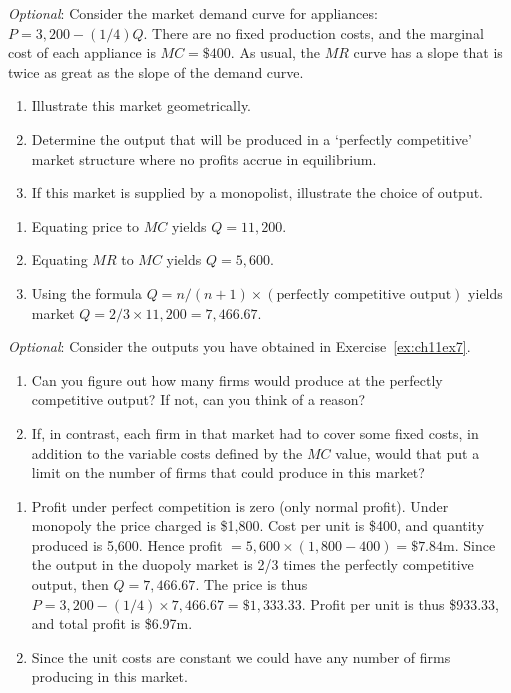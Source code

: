 \begin{enumialphparenastyle}
\begin{econex}\label{ex:ch11ex7}
\textit{Optional}: Consider the market demand curve for appliances: $P=3,200-(1/4)Q$. There are no fixed production costs, and the marginal cost of each appliance is $MC=\$400$. As usual, the $MR$ curve has a slope that is twice as great as the slope of the demand curve.
\begin{enumerate}
\item	Illustrate this market geometrically.
\item	Determine the output that will be produced in a `perfectly competitive' market structure where no profits accrue in equilibrium.
\item	If this market is supplied by a monopolist, illustrate the choice of output.
\end{enumerate}
\begin{econsolution}
\begin{enumerate}
\item	Equating price to $MC$ yields $Q=11,200$.
\item	Equating $MR$ to $MC$ yields $Q=5,600$.
\item	Using the formula $Q=n/(n+1)\times(\text{perfectly competitive output})$ yields market $Q=2/3\times 11,200=7,466.67$.
\end{enumerate}
\end{econsolution}
\end{econex}

\begin{econex}\label{ex:ch11ex8}
\textit{Optional}: Consider the outputs you have obtained in Exercise~\ref{ex:ch11ex7}.
\begin{enumerate}
\item	Can you figure out how many firms would produce at the perfectly competitive output? If not, can you think of a reason?
\item	If, in contrast, each firm in that market had to cover some fixed costs, in addition to the variable costs defined by the $MC$ value, would that put a limit on the number of firms that could produce in this market? 
\end{enumerate}
\begin{econsolution}
\begin{enumerate}
\item	Profit under perfect competition is zero (only normal profit). Under monopoly the price charged is \$1,800. Cost per  unit is \$400, and quantity produced is 5,600. Hence profit $=5,600\times(1,800-400)=\$7.84$m. Since the output in the duopoly market is 2/3 times the perfectly competitive output, then $Q=7,466.67$. The price is thus $P=3,200-(1/4)\times 7,466.67=\$1,333.33$. Profit per unit is thus \$933.33, and total profit is \$6.97m.
\item	Since the unit costs are constant we could have any number of firms producing in this market.
\end{enumerate}
\end{econsolution}
\end{econex}

\end{enumialphparenastyle}
